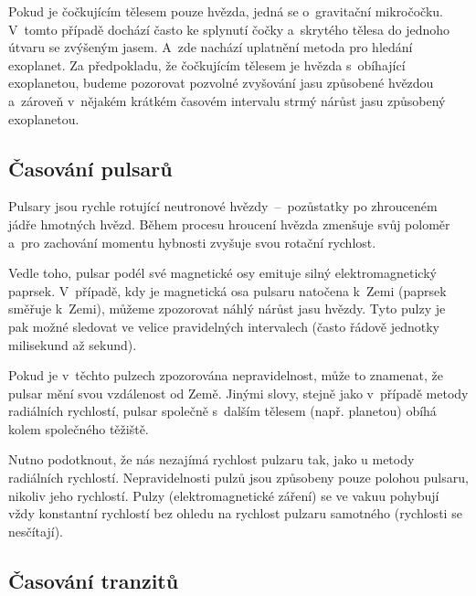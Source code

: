 \documentclass[a4paper,12pt]{article}
\begin{document}
{{{

Pokud je čočkujícím tělesem pouze hvězda, jedná se o~gravitační mikročočku. V~tomto případě dochází často ke splynutí čočky a~skrytého tělesa do jednoho útvaru se zvýšeným jasem. A~zde nachází uplatnění metoda pro hledání exoplanet. Za předpokladu, že čočkujícím tělesem je hvězda s~obíhající exoplanetou, budeme pozorovat pozvolné zvyšování jasu způsobené hvězdou a~zároveň v~nějakém krátkém časovém intervalu strmý nárůst jasu způsobený exoplanetou.~\cite{methods}

\subsection{Časování pulsarů}

Pulsary jsou rychle rotující neutronové hvězdy~--~pozůstatky po zhrouceném jádře hmotných hvězd. Během procesu hroucení hvězda zmenšuje svůj poloměr a~pro zachování momentu hybnosti zvyšuje svou rotační rychlost.~\cite{methods}

Vedle toho, pulsar podél své magnetické osy emituje silný elektromagnetický paprsek. V~případě, kdy je magnetická osa pulsaru natočena k~Zemi (paprsek směřuje k~Zemi), můžeme zpozorovat náhlý nárůst jasu hvězdy. Tyto pulzy je pak možné sledovat ve velice pravidelných intervalech (často řádově jednotky milisekund až sekund).~\cite{methods}

Pokud je v~těchto pulzech zpozorována nepravidelnost, může to znamenat, že pulsar mění svou vzdálenost od Země. Jinými slovy, stejně jako v~případě metody radiálních rychlostí, pulsar společně s~dalším tělesem (např. planetou) obíhá kolem společného těžiště.~\cite{methods}

Nutno podotknout, že nás nezajímá rychlost pulzaru tak, jako u metody radiálních rychlostí. Nepravidelnosti pulzů jsou způsobeny pouze polohou pulsaru, nikoliv jeho rychlostí. Pulzy (elektromagnetické záření) se ve vakuu pohybují vždy konstantní rychlostí bez ohledu na rychlost pulzaru samotného (rychlosti se nesčítají).

\drawgimp

\clearpage
\subsection{Časování tranzitů}


}}}
\end{document}
